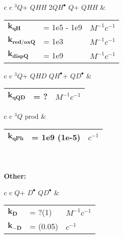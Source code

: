 \documentclass{article}
\def\QH{$QH^{\bullet }$}
\def\D{$D^{\bullet }$}
\def\Q{$Q$}
\def\Qt{$^{3}Q$}
\def\QHH{$QHH$}
\def\QHD{$QHD$}
\def\QD{$QD^{\bullet }$}
\begin{document}
\begin{tabular}{ c c }
    \schemestart
    \Qt + \QHH
    \arrow{->[$k_{qH}$]}
    2\QH
    \Q + \QHH
    \schemestop
     & \begin{tabular}{ l l l }
           $\mathbf{k_{qH}}$      & = 1e5 - 1e9 & $M^{-1}c^{-1}$ \\
           $\mathbf{k_{red/oxQ}}$ & = 1e3       & $M^{-1}c^{-1}$ \\
           $\mathbf{k_{dispQ}}$   & = 1e9       & $M^{-1}c^{-1}$ \\\hline
       \end{tabular}
    \vspace{1.5mm}
\end{tabular}
\vspace{1.5mm}


\begin{tabular}{ c c }
    \schemestart
    \Qt + \QHD
    \arrow{->[$k_{qQD}$]}
    \QH + \QD
    \schemestop
     & \begin{tabular}{ l l l }
           $\mathbf{k_{qQD}}$ & = ? & $M^{-1}c^{-1}$ \\\hline
       \end{tabular}
    \vspace{1.5mm}
\end{tabular}
\vspace{1.5mm}


\begin{tabular}{ c c }
    \schemestart
    \Qt
    \arrow{->[$k_{qPh}$]}
    prod
    \schemestop
     & \begin{tabular}{ l l l }
           $\mathbf{k_{qPh}}$ & = 1e9 (1e-5) & $c^{-1}$ \\\hline
       \end{tabular}
    \vspace{1.5mm}
\end{tabular}
\vspace{1.5mm}
\\
\\
\textbf{Other:}

\begin{tabular}{ c c }
    \schemestart
    \Q + \D
    \arrow{<=>[$k_{D}$][$k_{-D}$]}
    \QD
    \schemestop
     & \begin{tabular}{ l l l }
           $\mathbf{k_{D}}$  & = ?(1)   & $M^{-1}c^{-1}$ \\
           $\mathbf{k_{-D}}$ & = (0.05) & $c^{-1}$       \\\hline
       \end{tabular}
    \vspace{1.5mm}
\end{tabular}
\vspace{1.5mm}
\end{document}
